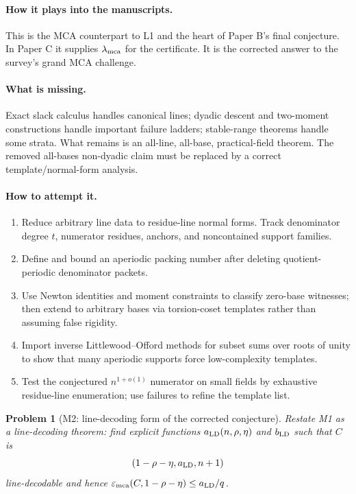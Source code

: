 \documentclass[11pt]{article}
\newtheorem{problem}[theorem]{Problem}
\theoremstyle{definition}
\theoremstyle{remark}
\newcommand{\emca}{\varepsilon_{\rm mca}}
\newcommand{\paperB}{Paper B}
\newcommand{\paperC}{Paper C}
\begin{document}
\paragraph{How it plays into the manuscripts.}  This is the MCA counterpart to L1 and the heart of \paperB's final conjecture.  In \paperC{} it supplies $\lambda_{\rm mca}$ for the certificate.  It is the corrected answer to the survey's grand MCA challenge.

\paragraph{What is missing.}  Exact slack calculus handles canonical lines; dyadic descent and two-moment constructions handle important failure ladders; stable-range theorems handle some strata.  What remains is an all-line, all-base, practical-field theorem.  The removed all-bases non-dyadic claim must be replaced by a correct template/normal-form analysis.

\paragraph{How to attempt it.}
\begin{enumerate}[leftmargin=2.2em]
\item Reduce arbitrary line data to residue-line normal forms.  Track denominator degree $t$, numerator residues, anchors, and noncontained support families.
\item Define and bound an aperiodic packing number after deleting quotient-periodic denominator packets.
\item Use Newton identities and moment constraints to classify zero-base witnesses; then extend to arbitrary bases via torsion-coset templates rather than assuming false rigidity.
\item Import inverse Littlewood--Offord methods for subset sums over roots of unity to show that many aperiodic supports force low-complexity templates.
\item Test the conjectured $n^{1+o(1)}$ numerator on small fields by exhaustive residue-line enumeration; use failures to refine the template list.
\end{enumerate}

\begin{problem}[M2: line-decoding form of the corrected conjecture]
\label{prob:M2}
Restate M1 as a line-decoding theorem: find explicit functions $a_{\rm LD}(n,\rho,\eta)$ and $b_{\rm LD}$ such that $C$ is
\[
        (1-\rho-\eta,
        a_{\rm LD},
        n+1)
\]
line-decodable and hence $\emca(C,1-\rho-\eta)\le a_{\rm LD}/q$.
\end{problem}
\end{document}
